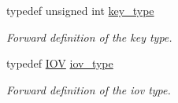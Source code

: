 \begin{DoxyCompactItemize}
typedef unsigned int \hyperlink{class_d_d4hep_1_1_alignments_1_1_alignment_ab824a65f935a0c79b9ea1a7a85014b88}{key\_\-type}
\begin{DoxyCompactList}\small\item\em Forward definition of the key type. \item\end{DoxyCompactList}\item 
typedef \hyperlink{class_d_d4hep_1_1_i_o_v}{IOV} \hyperlink{class_d_d4hep_1_1_alignments_1_1_alignment_afd988c803da5a514d8fa255784f29462}{iov\_\-type}
\begin{DoxyCompactList}\small\item\em Forward definition of the iov type. \item\end{DoxyCompactList}\end{DoxyCompactItemize}
